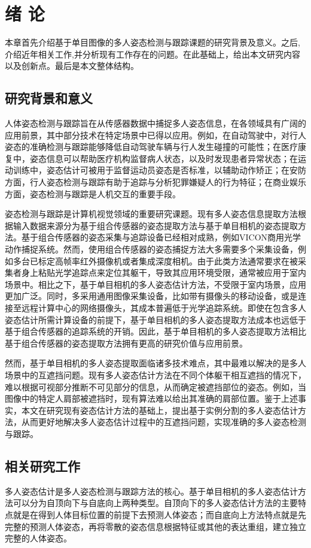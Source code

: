 \chapter{绪 论}
\label{cha:intro}

本章首先介绍基于单目图像的多人姿态检测与跟踪课题的研究背景及意义。之后,介绍近年相关工作,并分析现有工作存在的问题。在此基础上，给出本文研究内容以及创新点。最后是本文整体结构。

\section{研究背景和意义}
\label{sec:generalbackground}
人体姿态检测与跟踪旨在从传感器数据中捕捉多人姿态信息，在各领域具有广阔的应用前景，其中部分技术在特定场景中已得以应用。例如，在自动驾驶中，对行人姿态的准确检测与跟踪能够降低自动驾驶车辆与行人发生碰撞的可能性；在医疗康复中，姿态信息可以帮助医疗机构监督病人状态，以及时发现患者异常状态；在运动训练中，姿态估计可被用于监督运动员姿态是否标准，以辅助动作矫正；在安防方面，行人姿态检测与跟踪有助于追踪与分析犯罪嫌疑人的行为特征；在商业娱乐方面，姿态检测与跟踪是人机交互的重要手段。

姿态检测与跟踪是计算机视觉领域的重要研究课题。现有多人姿态信息提取方法根据输入数据来源分为基于组合传感器的姿态提取方法与基于单目相机的姿态提取方法。基于组合传感器的姿态采集与追踪设备已经相对成熟，例如VICON商用光学动作捕捉系统。然而，使用组合传感器的姿态捕捉方法大多需要多个采集设备，例如多台已标定高帧率红外摄像机或者集成深度相机。由于此类方法通常要求在被采集者身上粘贴光学追踪点来定位其躯干，导致其应用环境受限，通常被应用于室内场景中。相比之下，基于单目相机的多人姿态估计方法，不受限于室内场景，应用更加广泛。同时，多采用通用图像采集设备，比如带有摄像头的移动设备，或是连接至远程计算中心的网络摄像头，其成本普遍低于光学追踪系统。即使在包含多人姿态估计所需计算设备的前提下，基于单目相机的多人姿态提取方法成本也远低于基于组合传感器的追踪系统的开销。因此，基于单目相机的多人姿态提取方法相比基于组合传感器的姿态提取方法拥有更高的研究价值与应用前景。

然而，基于单目相机的多人姿态提取面临诸多技术难点，其中最难以解决的是多人场景中的互遮挡问题。现有多人姿态估计方法在不同个体躯干相互遮挡的情况下，难以根据可视部分推断不可见部分的信息，从而确定被遮挡部位的姿态。例如，当图像中的特定人肩部被遮挡时，现有算法难以给出其准确的肩部位置。鉴于上述事实，本文在研究现有姿态估计方法的基础上，提出基于实例分割的多人姿态估计方法，从而更好地解决多人姿态估计过程中的互遮挡问题，实现准确的多人姿态检测与跟踪。

\section{相关研究工作}
\label{sec:related_work}
多人姿态估计是多人姿态检测与跟踪方法的核心。基于单目相机的多人姿态估计方法可以分为自顶向下与自底向上两种类型。自顶向下的多人姿态估计方法的主要特点就是在得到人体目标位置的前提下去预测人体姿态；而自底向上方法特点就是先完整的预测人体姿态，再将零散的姿态信息根据特征或其他的表达重组，建立独立完整的人体姿态。

